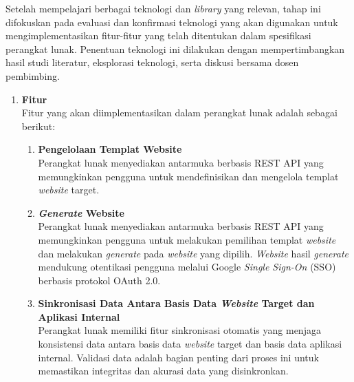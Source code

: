 Setelah mempelajari berbagai teknologi dan \textit{library} yang relevan, tahap ini difokuskan pada evaluasi dan konfirmasi teknologi yang akan digunakan untuk mengimplementasikan fitur-fitur yang telah ditentukan dalam spesifikasi perangkat lunak. Penentuan teknologi ini dilakukan dengan mempertimbangkan hasil studi literatur, eksplorasi teknologi, serta diskusi bersama dosen pembimbing.

\begin{enumerate}[label*=\arabic*.,ref=\arabic*]
    \item \textbf{Fitur}\\
    Fitur yang akan diimplementasikan dalam perangkat lunak adalah sebagai berikut:
    \begin{enumerate}[label=\alph*.]
        \item \textbf{Pengelolaan Templat Website}\\
        Perangkat lunak menyediakan antarmuka berbasis REST API yang memungkinkan pengguna untuk mendefinisikan dan mengelola templat \textit{website} target.
        
        \item \textbf{\textit{Generate} Website}\\
        Perangkat lunak menyediakan antarmuka berbasis REST API yang memungkinkan pengguna untuk melakukan pemilihan templat \textit{website} dan melakukan \textit{generate} pada \textit{website} yang dipilih. \textit{Website} hasil \textit{generate} mendukung otentikasi pengguna melalui Google \textit{Single Sign-On} (SSO) berbasis protokol OAuth 2.0.
    
        \item \textbf{Sinkronisasi Data Antara Basis Data \textit{Website} Target dan Aplikasi Internal}\\
        Perangkat lunak memiliki fitur sinkronisasi otomatis yang menjaga konsistensi data antara basis data \textit{website} target dan basis data aplikasi internal. Validasi data adalah bagian penting dari proses ini untuk memastikan integritas dan akurasi data yang disinkronkan.
    \end{enumerate}


\end{enumerate}
